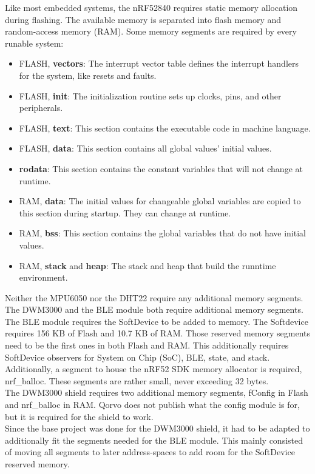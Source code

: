Like most embedded systems, the nRF52840 requires static memory allocation during flashing.
The available memory is separated into flash memory and random-access memory (RAM).
Some memory segments are required by every runable system:
\begin{itemize}
	\item FLASH, \textbf{vectors}: The interrupt vector table defines the interrupt handlers for the system, like resets and faults.
	\item FLASH, \textbf{init}: The initialization routine sets up clocks, pins, and other peripherals.
	\item FLASH, \textbf{text}: This section contains the executable code in machine language.
	\item FLASH, \textbf{data}: This section contains all global values' initial values.
	\item \textbf{rodata}: This section contains the constant variables that will not change at runtime.
	\item RAM, \textbf{data}: The initial values for changeable global variables are copied to this section during startup. They can change at runtime.
	\item RAM, \textbf{bss}: This section contains the global variables that do not have initial values.
	\item RAM, \textbf{stack} and \textbf{heap}: The stack and heap that build the runntime environment.
\end{itemize}
Neither the MPU6050 nor the DHT22 require any additional memory segments.
The DWM3000 and the BLE module both require additional memory segments. \\
The BLE module requires the SoftDevice to be added to memory. The Softdevice requires 156 KB of Flash and 10.7 KB of RAM.
Those reserved memory segments need to be the first ones in both Flash and RAM. 
This additionally requires SoftDevice observers for System on Chip (SoC), BLE, state, and stack. 
Additionally, a segment to house the nRF52 SDK memory allocator is required, nrf{\_}balloc. These segments are rather small, never exceeding 32 bytes.\\
The DWM3000 shield requires two additional memory segments, fConfig in Flash and nrf{\_}balloc in RAM. 
Qorvo does not publish what the config module is for, but it is required for the shield to work. \\
Since the base project was done for the DWM3000 shield, it had to be adapted to additionally fit the segments needed for the BLE module. 
This mainly consisted of moving all segments to later address-spaces to add room for the SoftDevice reserved memory.
